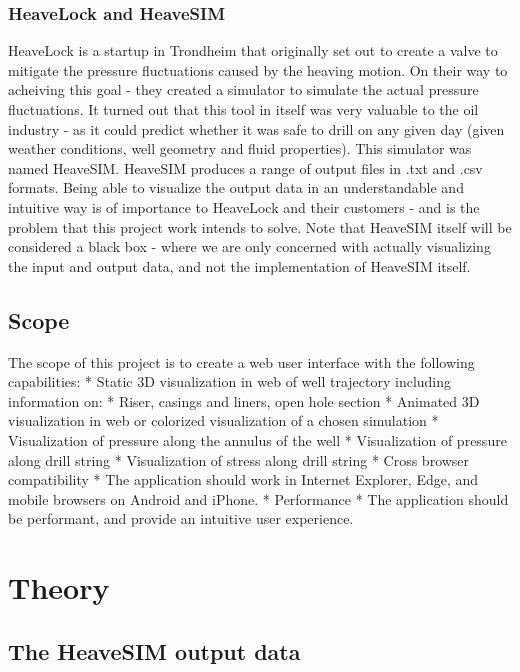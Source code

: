 \hypertarget{heavelock-and-heavesim}{%
\subsubsection{HeaveLock and HeaveSIM}\label{heavelock-and-heavesim}}

HeaveLock is a startup in Trondheim that originally set out to create a
valve to mitigate the pressure fluctuations caused by the heaving
motion. On their way to acheiving this goal - they created a simulator
to simulate the actual pressure fluctuations. It turned out that this
tool in itself was very valuable to the oil industry - as it could
predict whether it was safe to drill on any given day (given weather
conditions, well geometry and fluid properties). This simulator was
named HeaveSIM. HeaveSIM produces a range of output files in .txt and
.csv formats. Being able to visualize the output data in an
understandable and intuitive way is of importance to HeaveLock and their
customers - and is the problem that this project work intends to solve.
Note that HeaveSIM itself will be considered a black box - where we are
only concerned with actually visualizing the input and output data, and
not the implementation of HeaveSIM itself.

\hypertarget{scope}{%
\subsection{Scope}\label{scope}}

The scope of this project is to create a web user interface with the
following capabilities: * Static 3D visualization in web of well
trajectory including information on: * Riser, casings and liners, open
hole section * Animated 3D visualization in web or colorized
visualization of a chosen simulation * Visualization of pressure along
the annulus of the well * Visualization of pressure along drill string *
Visualization of stress along drill string * Cross browser compatibility
* The application should work in Internet Explorer, Edge, and mobile
browsers on Android and iPhone. * Performance * The application should
be performant, and provide an intuitive user experience.

\hypertarget{theory}{%
\section{Theory}\label{theory}}

\hypertarget{the-heavesim-output-data}{%
\subsection{The HeaveSIM output data}\label{the-heavesim-output-data}}

